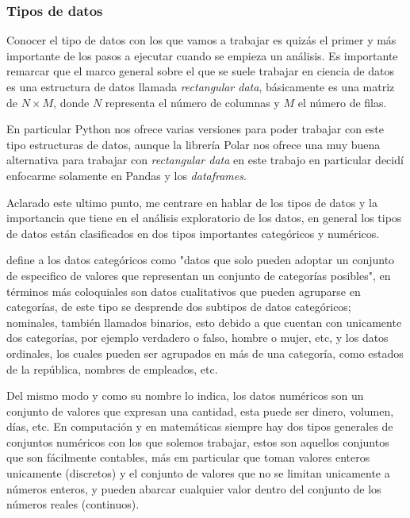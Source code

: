 \subsubsection{Tipos de datos}

Conocer el tipo de datos con los que vamos a trabajar es quizás el primer y más importante de los pasos a ejecutar cuando se empieza un análisis. Es importante remarcar que el marco general sobre el que se suele trabajar en ciencia de datos es una estructura de datos llamada \textsl{rectangular data}, básicamente es una matriz de $N \times M$, donde $N$ representa el número de columnas y $M$ el número de filas.  


En particular Python nos ofrece varias versiones para poder trabajar con este tipo estructuras de datos, aunque la librería Polar nos ofrece una muy buena alternativa para trabajar con \textsl{rectangular data} en este trabajo en particular decidí enfocarme solamente en Pandas y los \textsl{dataframes}. 


Aclarado este ultimo punto, me centrare en hablar de los tipos de datos y la importancia que tiene en el análisis exploratorio de los datos, en general los tipos de datos están clasificados en dos tipos importantes categóricos y numéricos. 

\citet[p. 3]{EstadisticaPracticacd} define a los datos categóricos como "datos que solo pueden adoptar un conjunto de especifico de valores que representan un conjunto de categorías posibles", en términos más coloquiales son datos cualitativos que pueden agruparse en categorías, de este tipo se desprende dos subtipos de datos categóricos; nominales, también llamados binarios, esto debido a que cuentan con unicamente dos categorías, por ejemplo verdadero o falso, hombre o mujer, etc, y los datos ordinales, los cuales pueden ser agrupados en más de una categoría, como estados de la república, nombres de empleados, etc.


Del mismo modo y como su nombre lo indica, los datos numéricos son un conjunto de valores que expresan una cantidad, esta puede ser dinero, volumen, días, etc. En computación y en matemáticas siempre hay dos tipos generales de conjuntos numéricos con los que solemos trabajar, estos son aquellos conjuntos que son fácilmente contables, más em particular que toman valores enteros unicamente (discretos) y el conjunto de valores que no se limitan unicamente a números enteros, y pueden abarcar cualquier valor dentro del conjunto de los números reales (continuos).


